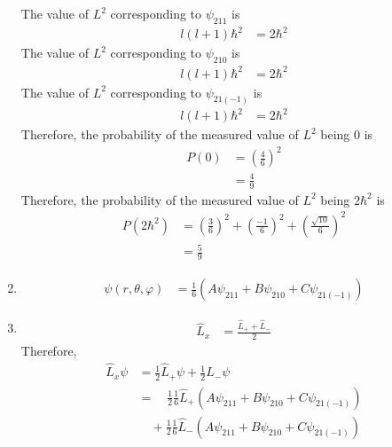 \documentclass[fleqn, a4paper, 11pt, oneside]{amsart}
\theoremstyle{definition}
\theoremstyle{theorem}
\begin{document}
\begin{solution}
\begin{enumerate}[leftmargin=*]
			The value of $L^2$ corresponding to $\psi_{2 1 1}$ is
			\begin{align*}
				l (l + 1) \hbar^2 & = 2 \hbar^2
			\end{align*}
			The value of $L^2$ corresponding to $\psi_{2 1 0}$ is
			\begin{align*}
				l (l + 1) \hbar^2 & = 2 \hbar^2
			\end{align*}
			The value of $L^2$ corresponding to $\psi_{2 1 (-1)}$ is
			\begin{align*}
				l (l + 1) \hbar^2 & = 2 \hbar^2
			\end{align*}
			Therefore, the probability of the measured value of $L^2$ being $0$ is
			\begin{align*}
				P(0) & = \left( \frac{4}{6} \right)^2 \\
                                     & = \frac{4}{9}
			\end{align*}
			Therefore, the probability of the measured value of $L^2$ being $2 \hbar^2$ is
			\begin{align*}
				P\left( 2 \hbar^2 \right) & = \left( \frac{3}{6} \right)^2 + \left( \frac{-1}{6} \right)^2 + \left( \frac{\sqrt{10}}{6} \right)^2 \\
                                                          & = \frac{5}{9}
			\end{align*}
		\item
			\begin{align*}
				\psi(r,\theta,\varphi) & = \frac{1}{6} \left( A \psi_{2 1 1} + B \psi_{2 1 0} + C \psi_{2 1 (-1)} \right)
			\end{align*}
		\item
			\begin{align*}
				\hat{L}_x & = \frac{\hat{L}_+ + \hat{L}_-}{2}
			\end{align*}
			Therefore,
			\begin{align*}
				\hat{L}_x \psi & = \frac{1}{2} \hat{L}_+ \psi + \frac{1}{2} \hat{L}_- \psi                                                                                                      \\
                                               & = \quad \frac{1}{2} \frac{1}{6} \hat{L}_+\left( A \psi_{2 1 1} + B \psi_{2 1 0} + C \psi_{2 1 (-1)} \right)                                                    \\
                                               & \quad + \frac{1}{2} \frac{1}{6} \hat{L}_-\left( A \psi_{2 1 1} + B \psi_{2 1 0} + C \psi_{2 1 (-1)} \right)                                                    \\

\end{align*}
\end{enumerate}
\end{solution}
\end{document}
